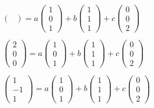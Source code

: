 \begin{example}
\begin{gather*}
\begin{pmatrix}
		\end{pmatrix} =
		a \begin{pmatrix}
			1 \\ 0 \\ 1
		\end{pmatrix} +
		b \begin{pmatrix}
			1 \\ 1 \\ 1
		\end{pmatrix} +
		c \begin{pmatrix}
			0 \\ 0 \\ 2
		\end{pmatrix}\\
		\\
		\begin{pmatrix}
			2 \\ 0 \\ 0
		\end{pmatrix} =
		a \begin{pmatrix}
			1 \\ 0 \\ 1
		\end{pmatrix} +
		b \begin{pmatrix}
			1 \\ 1 \\ 1
		\end{pmatrix} +
		c \begin{pmatrix}
			0 \\ 0 \\ 2
		\end{pmatrix}\\
		\\
		\begin{pmatrix}
			1 \\ -1 \\ 1
		\end{pmatrix} =
		a \begin{pmatrix}
			1 \\ 0 \\ 1
		\end{pmatrix} +
		b \begin{pmatrix}
			1 \\ 1 \\ 1
		\end{pmatrix} +
		c \begin{pmatrix}
			0 \\ 0 \\ 2
		\end{pmatrix}\\

\end{gather*}
\end{example}
